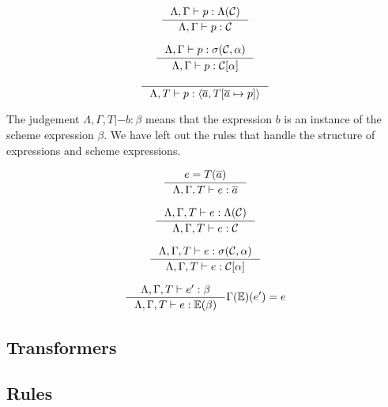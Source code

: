 \[
\inference
{\Lambda, \Gamma |- p : \Lambda(\mathcal{C})}
{\Lambda, \Gamma |- p : \mathcal{C}}
\]

\[
\inference
{\Lambda, \Gamma |- p : \sigma(\mathcal{C}, \alpha)}
{\Lambda, \Gamma |- p : \mathcal{C}[\alpha]}
\]

\[
\inference{}
{\Lambda, T |- p : \langle \overline{a}, T[\overline{a} \mapsto p] \rangle}
\]

The judgement $\Lambda, \Gamma, T |- b : \beta$ means that the expression $b$ is
an instance of the scheme expression $\beta$. We have left out the rules that
handle the structure of expressions and scheme expressions.

\[
\inference{e = T(\overline{a})}
{\Lambda, \Gamma, T |- e : \overline{a}}
\]

\[
\inference{\Lambda, \Gamma, T |- e : \Lambda(\mathcal{C})}
{\Lambda, \Gamma, T |- e : \mathcal{C}}
\]

\[
\inference
{\Lambda, \Gamma, T |- e : \sigma(\mathcal{C}, \alpha)}
{\Lambda, \Gamma, T |- e : \mathcal{C}[\alpha]}
\]

\[
\inference{\Lambda, \Gamma, T |- e' : \beta}
{\Lambda, \Gamma, T |- e : \mathbb{E}(\beta)}{\Gamma(\mathbb{E})(e') = e}
\]

\subsection{Transformers}

\subsection{Rules}





